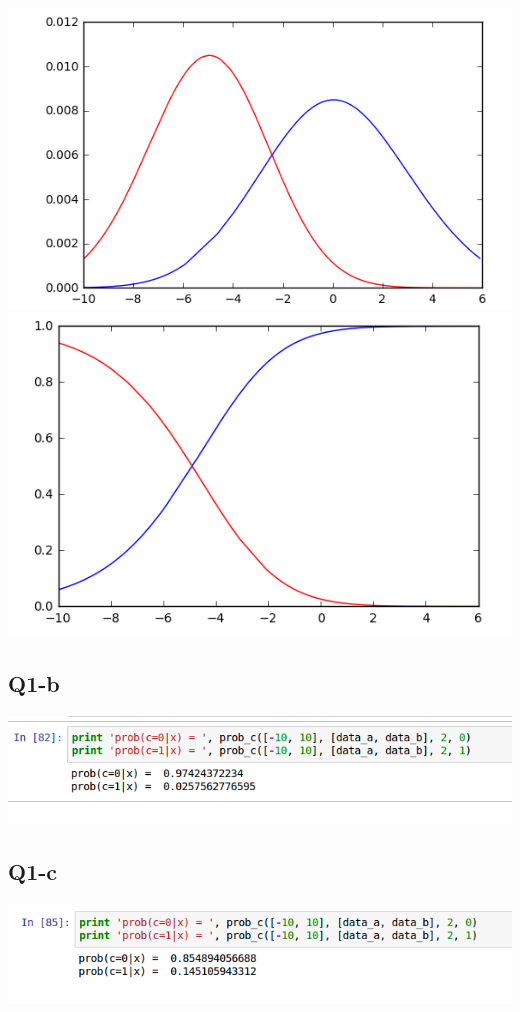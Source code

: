 \documentclass[11]{article}
\begin{document}
\includegraphics[scale=0.75]{1-a-8.png} \\
\includegraphics[scale=0.75]{1-a-9.png} \\


\subsection*{Q1-b}
\includegraphics[scale=0.75]{1-b.png} \\
 
\subsection*{Q1-c}
\includegraphics[scale=0.75]{1-c.png} \\
\end{document}
